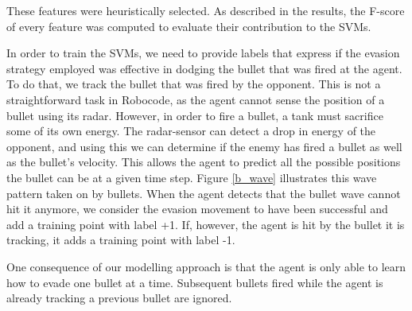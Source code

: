 \documentclass{article}
\theoremstyle{plain}
\theoremstyle{definition}
\theoremstyle{remark}
\begin{document}
These features were heuristically selected. As described in the results, the F-score of every feature was computed to evaluate their contribution to the SVMs.

In order to train the SVMs, we need to provide labels that express if the evasion strategy employed was effective in dodging the bullet that was fired at the agent. To do that, we track the bullet that was fired by the opponent. This is not a straightforward task in Robocode, as the agent cannot sense the position of a bullet using its radar. However, in order to fire a bullet, a tank must sacrifice some of its own energy. The radar-sensor can detect a drop in energy of the opponent, and using this we can determine if the enemy has fired a bullet as well as the bullet's velocity. This allows the agent to predict all the possible positions the bullet can be at a given time step.
Figure \ref{b_wave} illustrates this wave pattern taken on by bullets. When the agent detects that the bullet wave cannot hit it anymore, we consider the evasion movement to have been successful and add a training point with label +1. If, however, the agent is hit by the bullet it is tracking, it adds a training point with label -1.

One consequence of our modelling approach is that the agent is only able to learn how to evade one bullet at a time. Subsequent bullets fired while the agent is already tracking a previous bullet are ignored.
\end{document}
